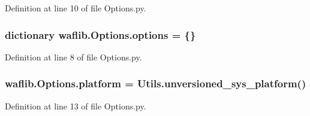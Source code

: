 Definition at line 10 of file Options.\+py.

\subsubsection[{\texorpdfstring{options}{options}}]{\setlength{\rightskip}{0pt plus 5cm}dictionary waflib.\+Options.\+options = \{\}}\hypertarget{namespacewaflib_1_1_options_a59b9c00933a268d11c1c960cd109e113}{}\label{namespacewaflib_1_1_options_a59b9c00933a268d11c1c960cd109e113}


Definition at line 8 of file Options.\+py.

\subsubsection[{\texorpdfstring{platform}{platform}}]{\setlength{\rightskip}{0pt plus 5cm}waflib.\+Options.\+platform = {\bf Utils.\+unversioned\+\_\+sys\+\_\+platform}()}\hypertarget{namespacewaflib_1_1_options_a5471b4f49bba1a36759b141851f7f4ce}{}\label{namespacewaflib_1_1_options_a5471b4f49bba1a36759b141851f7f4ce}


Definition at line 13 of file Options.\+py.

